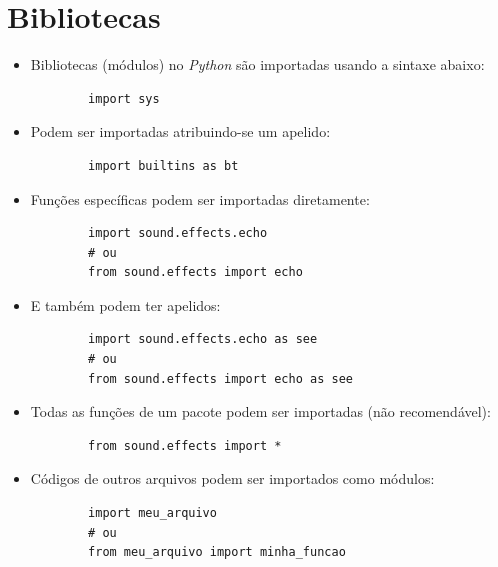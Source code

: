 \section{Bibliotecas}
\begin{itemize}
	\item Bibliotecas (módulos) no \textit{Python} são importadas usando a sintaxe abaixo:
	\begin{verbatim}
		import sys
	\end{verbatim}
	\item Podem ser importadas atribuindo-se um apelido:
	\begin{verbatim}
		import builtins as bt
	\end{verbatim}
	\item Funções específicas podem ser importadas diretamente:
	\begin{verbatim}
		import sound.effects.echo
		# ou
		from sound.effects import echo
	\end{verbatim}
	\item E também podem ter apelidos:
	\begin{verbatim}
		import sound.effects.echo as see
		# ou
		from sound.effects import echo as see
	\end{verbatim}
	\item Todas as funções de um pacote podem ser importadas (não recomendável):
	\begin{verbatim}
		from sound.effects import *
	\end{verbatim}
	\item Códigos de outros arquivos podem ser importados como módulos:
	\begin{verbatim}
		import meu_arquivo
		# ou
		from meu_arquivo import minha_funcao
	\end{verbatim}
\end{itemize}


